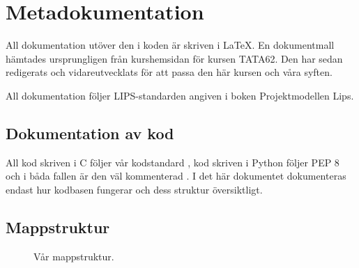 
\section{Metadokumentation}

All dokumentation utöver den i koden är skriven i \LaTeX. En dokumentmall hämtades ursprungligen från kurshemsidan för kursen TATA62\cite{lipsmall}. Den har sedan redigerats och vidareutvecklats för att passa den här kursen och våra syften.

All dokumentation följer LIPS-standarden angiven i boken Projektmodellen Lips\cite{LIPS}.

\subsection{Dokumentation av kod}

All kod skriven i C följer vår kodstandard , kod skriven i Python följer PEP 8 och i båda fallen är den väl kommenterad . I det här dokumentet dokumenteras endast hur kodbasen fungerar och dess struktur översiktligt.

\subsection{Mappstruktur}

\begin{figure}[h!]
	\caption{Vår mappstruktur. }
	\label{fig:dir}
\end{figure}
